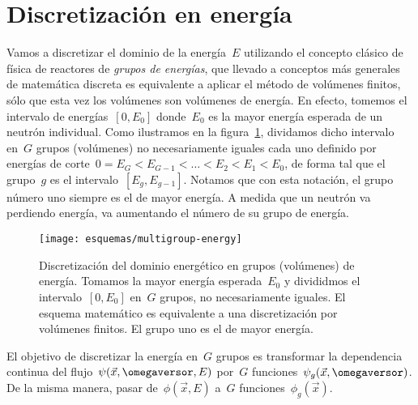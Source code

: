 \section{Discretización en energía}

Vamos a discretizar el dominio de la energía~$E$ utilizando el concepto clásico de física de reactores de \emph{grupos de energías}, que llevado a conceptos más generales de matemática discreta es equivalente a aplicar el método de volúmenes finitos, sólo que esta vez los volúmenes son volúmenes de energía. En efecto, tomemos el intervalo de energías~$[0,E_0]$ donde~$E_0$ es la mayor energía esperada de un neutrón individual. Como ilustramos en la figura~\ref{fig:multigroup}, dividamos dicho intervalo en~$G$ grupos (volúmenes) no necesariamente iguales cada uno definido por energías de corte~$0=E_G < E_{G-1} < \dots < E_2 < E_1 < E_0$, de forma tal que el grupo~$g$ es el intervalo~$[E_g,E_{g-1}]$. Notamos que con esta notación, el grupo número uno siempre es el de mayor energía. A medida que un neutrón va perdiendo energía, va aumentando el número de su grupo de energía.

\begin{figure}[h]
\begin{center}
\texttt{[image: esquemas/multigroup-energy]}
\end{center}
\caption{\label{fig:multigroup}Discretización del dominio energético en grupos (volúmenes) de energía. Tomamos la mayor energía esperada~$E_0$ y divididmos el intervalo~$[0,E_0]$ en~$G$ grupos, no necesariamente iguales. El esquema matemático es equivalente a una discretización por volúmenes finitos. El grupo uno es el de mayor energía.}
\end{figure}


El objetivo de discretizar la energía en~$G$ grupos es transformar la dependencia continua del flujo~$\psi(\vec{x}, \omegaversor, E)$ por~$G$ funciones~$\psi_g(\vec{x}, \omegaversor)$. De la misma manera, pasar de~$\phi(\vec{x}, E)$ a~$G$ funciones~$\phi_g(\vec{x})$.

